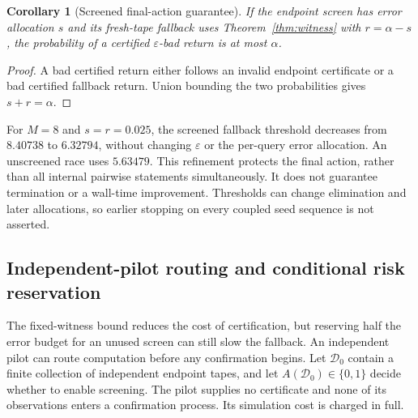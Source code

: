 \documentclass[preprint,11pt,sort&compress]{elsarticle}
\newtheorem{corollary}[theorem]{Corollary}
\begin{document}
\begin{corollary}[Screened final-action guarantee]
If the endpoint screen has error allocation $s$ and its fresh-tape fallback
uses Theorem~\ref{thm:witness} with $r=\alpha-s$, the probability of a
certified $\varepsilon$-bad return is at most $\alpha$.
\end{corollary}
\begin{proof}
A bad certified return either follows an invalid endpoint certificate or a
bad certified fallback return. Union bounding the two probabilities gives
$s+r=\alpha$.
\end{proof}

For $M=8$ and $s=r=0.025$, the screened fallback threshold decreases from
$8.40738$ to $6.32794$, without changing $\varepsilon$ or the per-query error
allocation. An unscreened race uses $5.63479$. This refinement protects the
final action, rather than all internal pairwise statements simultaneously.
It does not guarantee termination or a wall-time improvement. Thresholds
can change elimination and later allocations, so earlier stopping on every
coupled seed sequence is not asserted.

\subsection{Independent-pilot routing and conditional risk reservation}
\label{sec:conditional_routing}
The fixed-witness bound reduces the cost of certification, but reserving
half the error budget for an unused screen can still slow the fallback.
An independent pilot can route computation before any confirmation begins.
Let $\mathcal D_0$ contain a finite collection of independent endpoint tapes,
and let $A(\mathcal D_0)\in\{0,1\}$ decide whether to enable screening.
The pilot supplies no certificate and none of its observations enters a
confirmation process. Its simulation cost is charged in full.
\end{document}
